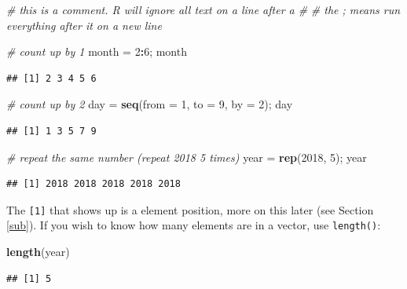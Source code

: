 \documentclass[]{book}
\newenvironment{Shaded}{\begin{snugshade}}{\end{snugshade}}
\newcommand{\KeywordTok}[1]{\textcolor[rgb]{0.13,0.29,0.53}{\textbf{#1}}}
\newcommand{\DataTypeTok}[1]{\textcolor[rgb]{0.13,0.29,0.53}{#1}}
\newcommand{\DecValTok}[1]{\textcolor[rgb]{0.00,0.00,0.81}{#1}}
\newcommand{\StringTok}[1]{\textcolor[rgb]{0.31,0.60,0.02}{#1}}
\newcommand{\CommentTok}[1]{\textcolor[rgb]{0.56,0.35,0.01}{\textit{#1}}}
\newcommand{\OperatorTok}[1]{\textcolor[rgb]{0.81,0.36,0.00}{\textbf{#1}}}
\newcommand{\NormalTok}[1]{#1}
\theoremstyle{definition}
\theoremstyle{definition}
\theoremstyle{definition}
\theoremstyle{remark}
\begin{document}
\begin{Shaded}
\begin{Highlighting}[]
\CommentTok{# this is a comment. R will ignore all text on a line after a #}
\CommentTok{# the ; means run everything after it on a new line}

\CommentTok{# count up by 1}
\NormalTok{month =}\StringTok{ }\DecValTok{2}\OperatorTok{:}\DecValTok{6}\NormalTok{; month}
\end{Highlighting}
\end{Shaded}

\begin{verbatim}
## [1] 2 3 4 5 6
\end{verbatim}

\begin{Shaded}
\begin{Highlighting}[]
\CommentTok{# count up by 2}
\NormalTok{day =}\StringTok{ }\KeywordTok{seq}\NormalTok{(}\DataTypeTok{from =} \DecValTok{1}\NormalTok{, }\DataTypeTok{to =} \DecValTok{9}\NormalTok{, }\DataTypeTok{by =} \DecValTok{2}\NormalTok{); day}
\end{Highlighting}
\end{Shaded}

\begin{verbatim}
## [1] 1 3 5 7 9
\end{verbatim}

\begin{Shaded}
\begin{Highlighting}[]
\CommentTok{# repeat the same number (repeat 2018 5 times)}
\NormalTok{year =}\StringTok{ }\KeywordTok{rep}\NormalTok{(}\DecValTok{2018}\NormalTok{, }\DecValTok{5}\NormalTok{); year}
\end{Highlighting}
\end{Shaded}

\begin{verbatim}
## [1] 2018 2018 2018 2018 2018
\end{verbatim}

The \texttt{{[}1{]}} that shows up is a element position, more on this
later (see Section \ref{sub}). If you wish to know how many elements are
in a vector, use \texttt{length()}:

\begin{Shaded}
\begin{Highlighting}[]
\KeywordTok{length}\NormalTok{(year)}
\end{Highlighting}
\end{Shaded}

\begin{verbatim}
## [1] 5
\end{verbatim}
\end{document}
